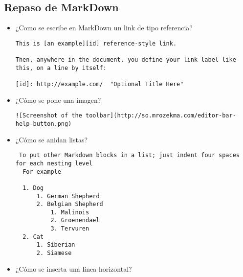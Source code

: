 \subsection{Repaso de MarkDown}\label{repaso-de-markdown}

\begin{itemize}
\item
  ¿Como se escribe en MarkDown un link de tipo referencia?

\begin{verbatim}
This is [an example][id] reference-style link.

Then, anywhere in the document, you define your link label like this, on a line by itself:

[id]: http://example.com/  "Optional Title Here"
\end{verbatim}
\item
  ¿Cómo se pone una imagen?

\begin{verbatim}
![Screenshot of the toolbar](http://so.mrozekma.com/editor-bar-help-button.png)
\end{verbatim}
\item
  ¿Cómo se anidan listas?

\begin{verbatim}
 To put other Markdown blocks in a list; just indent four spaces for each nesting level
  For example 

  1. Dog
      1. German Shepherd
      2. Belgian Shepherd
          1. Malinois
          2. Groenendael
          3. Tervuren
  2. Cat
      1. Siberian
      2. Siamese
\end{verbatim}
\item
  ¿Cómo se inserta una línea horizontal?
\end{itemize}
